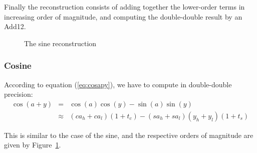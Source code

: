 Finally the reconstruction consists of adding together the lower-order
terms in increasing order of magnitude, and computing the
double-double result by an Add12.

\begin{figure}[htbp]
  \begin{center}
    \small
    \setlength{\unitlength}{3ex}
   \end{center}
   \caption{The sine reconstruction}
   \label{fig:sine-reconstruction}
 \end{figure}



\subsubsection{Cosine}
According to equation (\ref{eq:cosapy}), we have to compute in double-double precision:
 \begin{eqnarray*}
  \cos(a+y) &=& \cos(a) \cos(y)  - \sin(a)\sin(y)  \\
  & \approx& (ca_h+ca_l)(1+t_c) - (sa_h+sa_l)(y_h+y_l)(1+t_s)
\end{eqnarray*}

This is similar to the case of the sine, and the respective orders of
magnitude are given by Figure~\ref{fig:sine-reconstruction}.

